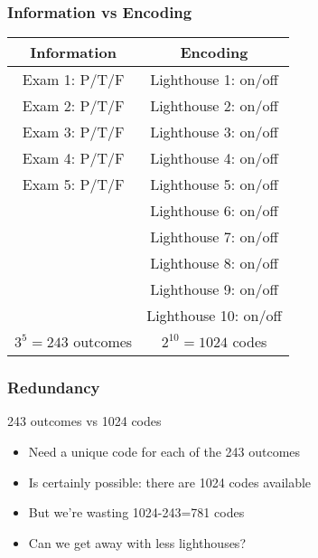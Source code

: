 \begin{frame}
  \frametitle{Information vs Encoding}
  \begin{center}
    \begin{tabular}{c@{\hspace{1cm}}c}
      \textbf{Information} & \textbf{Encoding} \\
      \toprule
      Exam 1: P/T/F & Lighthouse 1: on/off \\
      Exam 2: P/T/F & Lighthouse 2: on/off \\
      Exam 3: P/T/F & Lighthouse 3: on/off \\
      Exam 4: P/T/F & Lighthouse 4: on/off \\
      Exam 5: P/T/F & Lighthouse 5: on/off \\
                    & Lighthouse 6: on/off \\
                    & Lighthouse 7: on/off \\
                    & Lighthouse 8: on/off \\
                    & Lighthouse 9: on/off \\
                    & Lighthouse 10: on/off \\
      \midrule
      $3^5 = 243$ outcomes & $2^{10} = 1024$ codes
    \end{tabular}
  \end{center}
\end{frame}

\begin{frame}
  \frametitle{Redundancy}
  \begin{center}
    243 outcomes vs 1024 codes
  \end{center}
  \begin{itemize}
    \item Need a unique code for each of the 243 outcomes
    \item Is certainly possible: there are 1024 codes available
    \item But we're wasting 1024-243=781 codes
    \item Can we get away with less lighthouses?
  \end{itemize}
\end{frame}

